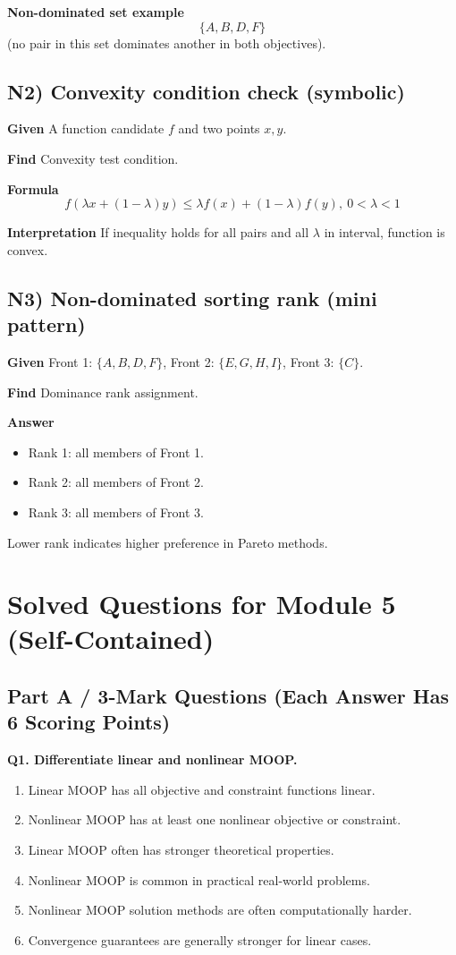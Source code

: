 \documentclass[11pt,a4paper]{article}
\begin{document}
\textbf{Non-dominated set example}
\[
\{A,B,D,F\}
\]
(no pair in this set dominates another in both objectives).

\subsection*{N2) Convexity condition check (symbolic)}
\textbf{Given}
A function candidate $f$ and two points $x,y$.

\textbf{Find}
Convexity test condition.

\textbf{Formula}
\[
f(\lambda x+(1-\lambda)y)\le \lambda f(x)+(1-\lambda)f(y),\ 0<\lambda<1
\]

\textbf{Interpretation}
If inequality holds for all pairs and all $\lambda$ in interval, function is convex.

\subsection*{N3) Non-dominated sorting rank (mini pattern)}
\textbf{Given}
Front 1: $\{A,B,D,F\}$, Front 2: $\{E,G,H,I\}$, Front 3: $\{C\}$.

\textbf{Find}
Dominance rank assignment.

\textbf{Answer}
\begin{itemize}
\item Rank 1: all members of Front 1.
\item Rank 2: all members of Front 2.
\item Rank 3: all members of Front 3.
\end{itemize}
Lower rank indicates higher preference in Pareto methods.

\section*{Solved Questions for Module 5 (Self-Contained)}

\subsection*{Part A / 3-Mark Questions (Each Answer Has 6 Scoring Points)}

\textbf{Q1. Differentiate linear and nonlinear MOOP.}
\begin{enumerate}
\item Linear MOOP has all objective and constraint functions linear.
\item Nonlinear MOOP has at least one nonlinear objective or constraint.
\item Linear MOOP often has stronger theoretical properties.
\item Nonlinear MOOP is common in practical real-world problems.
\item Nonlinear MOOP solution methods are often computationally harder.
\item Convergence guarantees are generally stronger for linear cases.
\end{enumerate}
\end{document}
